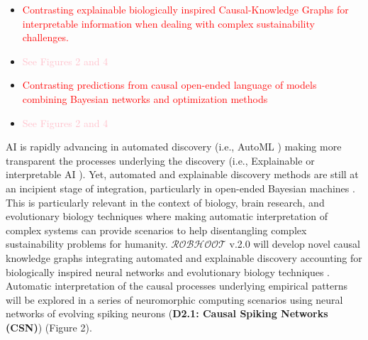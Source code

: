 \documentclass[11pt, a4paper]{article} %
\begin{document}
  \begin{itemize}
  \item \textcolor{red}{Contrasting explainable biologically inspired
      Causal-Knowledge Graphs for interpretable information when
      dealing with complex sustainability challenges.}
   \item \textcolor{pink}{See Figures 2 and 4}
   \item \textcolor{red}{Contrasting predictions from causal
       open-ended language of models combining Bayesian networks and
       optimization methods}
   \item \textcolor{pink}{See Figures 2 and 4}
   \end{itemize}

   AI is rapidly advancing in automated discovery (i.e., AutoML
   \citep{Real2020}) making more transparent the processes underlying
   the discovery (i.e., Explainable or interpretable AI
   \citep{Gil2019,Futia2020}). Yet, automated and explainable
   discovery methods are still at an incipient stage of integration,
   particularly in open-ended Bayesian machines
   \citep{Guimera2020}. This is particularly relevant in the context
   of biology, brain research, and evolutionary biology techniques
   where making automatic interpretation of complex systems can
   provide scenarios to help disentangling complex sustainability
   problems for humanity. $\mathcal{ROBHOOT}$ v.2.0 will develop novel
   causal knowledge graphs integrating automated and explainable
   discovery accounting for biologically inspired neural networks and
   evolutionary biology techniques
   \citep{Maass2014,Maass2015}. Automatic interpretation of the causal
   processes underlying empirical patterns will be explored in a
   series of neuromorphic computing scenarios using neural networks of
   evolving spiking neurons ({\bf D2.1: Causal Spiking Networks
     (CSN)}) (Figure 2).
\end{document}
